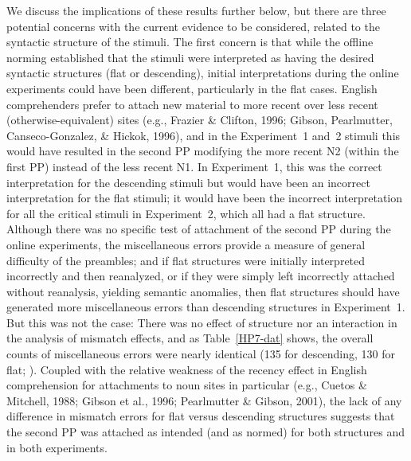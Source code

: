 \documentclass[12pt,titlepage]{article}
\newcommand{\NOTE}[1]{\textbf{*** #1 ***}}  %
\newcommand{\IGNORE}[1]{} %
\begin{document}
We discuss the implications of these results further below, but there are
three potential concerns with the current evidence to be considered,
related to the syntactic structure of the stimuli.  The first concern is
that while the offline norming established that the stimuli were
interpreted as having the desired syntactic structures (flat or
descending), initial interpretations during the online experiments could
have been different, particularly in the flat cases.  English comprehenders
prefer to attach new material to more recent over less recent
(otherwise-equivalent) sites (e.g., Frazier \& Clifton, 1996; Gibson,
Pearlmutter, Canseco-Gonzalez, \& Hickok, 1996), and in the Experiment~1
and~2 stimuli this would have resulted in the second PP modifying the more
recent N2 (within the first PP) instead of the less recent N1.  In
Experiment~1, this was the correct interpretation for the descending
stimuli but would have been an incorrect interpretation for the flat
stimuli; it would have been the incorrect interpretation for all the
critical stimuli in Experiment~2, which all had a flat structure.  Although
there was no specific test of attachment of the second PP during the online
experiments, the miscellaneous errors provide a measure of general
difficulty of the preambles; and if flat structures were initially
interpreted incorrectly and then reanalyzed, or if they were simply left
incorrectly attached without reanalysis, yielding semantic anomalies, then
flat structures should have generated more miscellaneous errors than
descending structures in Experiment~1.  But this was not the case: There
was no effect of structure nor an interaction in the analysis of mismatch
effects, and as Table~\ref{HP7-dat} shows, the overall counts of
miscellaneous errors were nearly identical (135 for descending, 130 for
flat; \Fsweak\IGNORE{overall struc Fs<1; int Fs<1.4, ps>.25}).  Coupled
with the relative weakness of the recency effect in English comprehension
for attachments to noun sites in particular (e.g., Cuetos \& Mitchell,
1988; Gibson et al., 1996; Pearlmutter \& Gibson, 2001), the lack of any
difference in mismatch errors for flat versus descending structures
suggests that the second PP was attached as intended (and as normed) for
both structures and in both experiments.\IGNORE{ \NOTE{should we thank Iris
for pointing out this concern in a footnote or something?  I heard it from
other people at CUNY as well, but she was the first to point it out (to me
at least)} -- think we probably don't need the ack in this case -- the
concern about interpreting these structures (PP attachment ambiguity) is a
pretty common issue -- that's why we needed to do the attachment norming}
\end{document}
